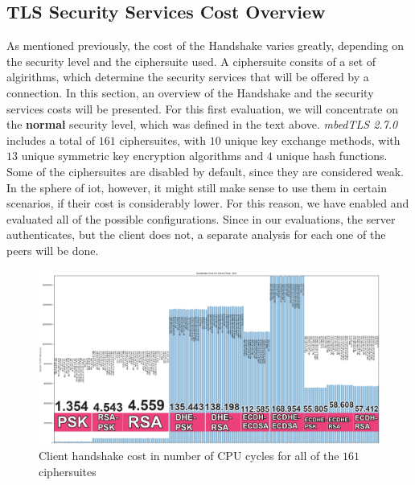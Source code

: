 \subsection{TLS Security Services Cost Overview} \label{sec:ss-overview}

As mentioned previously, the cost of the Handshake varies greatly, depending on the security level and the ciphersuite used.
A ciphersuite consits of a set of algirithms, which determine the security services that will be offered by a connection.
In this section, an overview of the Handshake and the security services costs will be presented. For this
first evaluation, we will concentrate on the \textbf{normal} security level, which was defined in the text above.
\textit{mbedTLS 2.7.0} includes a total of $161$ ciphersuites, with $10$ unique key exchange methods, with $13$ unique
symmetric key encryption algorithms and $4$ unique hash functions. Some of the ciphersuites are disabled by default,
since they are considered weak. In the sphere of \gls{iot}, however, it might still make sense to use them in certain
scenarios, if their cost is considerably lower. For this reason, we have enabled and evaluated all of the possible configurations.
Since in our evaluations, the server authenticates, but the client does not, a separate analysis for each one of the peers will be done.

\begin{figure}
  \centering
  \includegraphics[width=1.0\textwidth]{img/hs_cost_cli.png}
  \centering \caption{\label{fig:hs-all-ciphers-cli} Client handshake cost in number of CPU cycles for all of the $161$ ciphersuites}
\end{figure}


